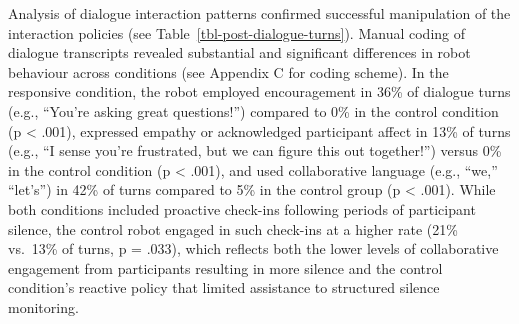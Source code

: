 \documentclass[
  authoryear,
  doubleblind,
  3p]{elsarticle}
\begin{document}
\begin{table}

\caption{\label{tbl-post-eligible}Post-Interaction Trust and Task
Accuracy (eligible sample)}


\end{table}%

Analysis of dialogue interaction patterns confirmed successful
manipulation of the interaction policies (see
Table~\ref{tbl-post-dialogue-turns}). Manual coding of dialogue
transcripts revealed substantial and significant differences in robot
behaviour across conditions (see Appendix C for coding scheme). In the
responsive condition, the robot employed encouragement in 36\% of
dialogue turns (e.g., ``You're asking great questions!'') compared to
0\% in the control condition (p \textless{} .001), expressed empathy or
acknowledged participant affect in 13\% of turns (e.g., ``I sense you're
frustrated, but we can figure this out together!'') versus 0\% in the
control condition (p \textless{} .001), and used collaborative language
(e.g., ``we,'' ``let's'') in 42\% of turns compared to 5\% in the
control group (p \textless{} .001). While both conditions included
proactive check-ins following periods of participant silence, the
control robot engaged in such check-ins at a higher rate (21\% vs.~13\%
of turns, p = .033), which reflects both the lower levels of
collaborative engagement from participants resulting in more silence and
the control condition's reactive policy that limited assistance to
structured silence monitoring.
\end{document}
